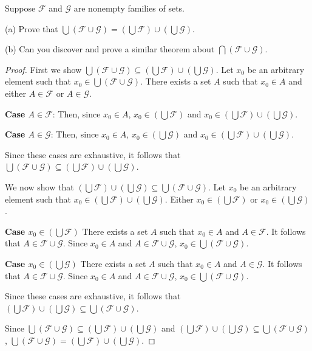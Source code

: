 \begin{tcolorbox}[title=Problem 16, breakable]
    Suppose $\mathcal{F}$ and $\mathcal{G}$ are nonempty families of sets.

    (a) Prove that $\bigcup(\mathcal{F} \cup \mathcal{G}) = (\bigcup \mathcal{F}) \cup (\bigcup \mathcal{G})$.

    (b) Can you discover and prove a similar theorem about $\bigcap(\mathcal{F} \cup \mathcal{G})$.
\end{tcolorbox}

\begin{proof}
    First we show $\bigcup(\mathcal{F} \cup \mathcal{G}) \subseteq (\bigcup \mathcal{F}) \cup (\bigcup \mathcal{G})$.
    Let $x_0$ be an arbitrary element such that $x_0 \in \bigcup(\mathcal{F} \cup \mathcal{G})$.
    There exists a set $A$ such that $x_0 \in A$ and either $A \in \mathcal{F}$ or $A \in \mathcal{G}$.

    \textbf{Case $A \in \mathcal{F}$}: Then, since $x_0 \in A$, 
    $x_0 \in (\bigcup \mathcal{F})$ and $x_0 \in (\bigcup \mathcal{F}) \cup (\bigcup \mathcal{G})$.

    \textbf{Case $A \in \mathcal{G}$}: Then, since $x_0 \in A$, 
    $x_0 \in (\bigcup \mathcal{G})$ and $x_0 \in (\bigcup \mathcal{F}) \cup (\bigcup \mathcal{G})$.

    Since these cases are exhaustive, it follows that $\bigcup(\mathcal{F} \cup
        \mathcal{G}) \subseteq (\bigcup \mathcal{F}) \cup (\bigcup \mathcal{G})$.

    We now show that $(\bigcup \mathcal{F}) \cup (\bigcup \mathcal{G}) \subseteq
        \bigcup(\mathcal{F} \cup \mathcal{G})$. Let $x_0$ be an arbitrary element such
    that $x_0 \in (\bigcup \mathcal{F}) \cup (\bigcup \mathcal{G})$. Either $x_0
        \in (\bigcup \mathcal{F})$ or $x_0 \in (\bigcup \mathcal{G})$.

    \textbf{Case $x_0 \in (\bigcup\mathcal{F})$} There exists a set $A$ such that $x_0 \in A$ and $A \in \mathcal{F}$.
    It follows that $A \in \mathcal{F} \cup \mathcal{G}$.
    Since $x_0 \in A$ and $A \in \mathcal{F} \cup \mathcal{G}$, $x_0 \in \bigcup(\mathcal{F} \cup \mathcal{G})$.

    \textbf{Case $x_0 \in (\bigcup\mathcal{G})$} There exists a set $A$ such that $x_0 \in A$ and $A \in \mathcal{G}$.
    It follows that $A \in \mathcal{F} \cup \mathcal{G}$.
    Since $x_0 \in A$ and $A \in \mathcal{F} \cup \mathcal{G}$, $x_0 \in \bigcup(\mathcal{F} \cup \mathcal{G})$.

    Since these cases are exhaustive, it follows that $(\bigcup \mathcal{F}) \cup
        (\bigcup \mathcal{G}) \subseteq \bigcup(\mathcal{F} \cup \mathcal{G})$.

    Since $\bigcup(\mathcal{F} \cup \mathcal{G}) \subseteq (\bigcup \mathcal{F})
        \cup (\bigcup \mathcal{G})$ and $(\bigcup \mathcal{F}) \cup (\bigcup
        \mathcal{G}) \subseteq \bigcup(\mathcal{F} \cup \mathcal{G})$,
    $\bigcup(\mathcal{F} \cup \mathcal{G}) = (\bigcup \mathcal{F}) \cup (\bigcup
        \mathcal{G})$.
\end{proof}

